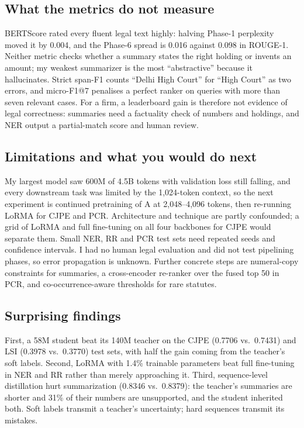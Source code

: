\documentclass[11pt, oneside]{article}
\begin{document}
\subsection{What the metrics do not measure}
BERTScore rated every fluent legal text highly: halving Phase-1 perplexity moved it by 0.004, and the Phase-6 spread is
0.016 against 0.098 in ROUGE-1. Neither metric checks whether a summary states the right holding or invents an amount;
my weakest summarizer is the most ``abstractive'' because it hallucinates. Strict span-F1 counts ``Delhi High Court''
for ``High Court'' as two errors, and micro-F1@7 penalises a perfect ranker on queries with more than seven relevant
cases. For a firm, a leaderboard gain is therefore not evidence of legal correctness: summaries need a factuality check
of numbers and holdings, and NER output a partial-match score and human review.

\subsection{Limitations and what you would do next}
My largest model saw 600M of 4.5B tokens with validation loss still falling, and every downstream task was limited
by the 1{,}024-token context, so the next experiment is continued pretraining of A at 2{,}048--4{,}096 tokens, then
re-running LoRMA for CJPE and PCR. Architecture and technique are partly confounded; a grid of LoRMA and full
fine-tuning on all four backbones for CJPE would separate them. Small NER, RR and PCR test sets need repeated seeds and
confidence intervals. I had no human legal evaluation and did not test pipelining phases, so error propagation is
unknown. Further concrete steps are numeral-copy constraints for summaries, a cross-encoder re-ranker over the fused
top 50 in PCR, and co-occurrence-aware thresholds for rare statutes.

\subsection{Surprising findings}
First, a 58M student beat its 140M teacher on the CJPE (0.7706 vs.\ 0.7431) and LSI (0.3978 vs.\ 0.3770) test sets,
with half the gain coming from the teacher's soft labels. Second, LoRMA with 1.4\% trainable parameters beat full
fine-tuning in NER and RR rather than merely approaching it. Third, sequence-level distillation hurt summarization
(0.8346 vs.\ 0.8379): the teacher's summaries are shorter and 31\% of their numbers are unsupported, and the student
inherited both. Soft labels transmit a teacher's uncertainty; hard sequences transmit its mistakes.
\end{document}
